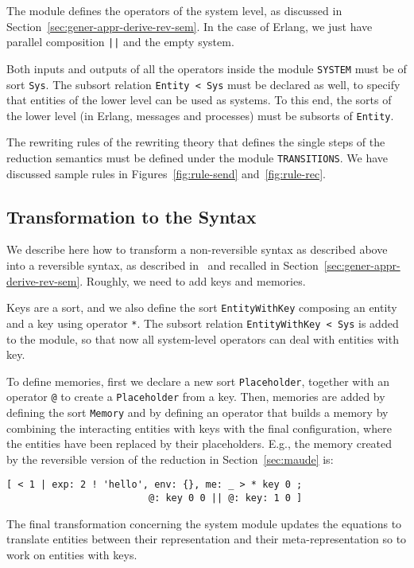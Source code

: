 \documentclass{article}[12pt,a4paper]
\theoremstyle{definition}
\begin{document}
The module defines the operators of the system level, as discussed in Section~\ref{sec:gener-appr-derive-rev-sem}. In the case of Erlang, we just have parallel composition \verb+||+ and the empty system.

Both inputs and outputs of all the operators inside the module \verb+SYSTEM+ must be of sort
\verb+Sys+. The subsort
relation \verb+Entity < Sys+ must be declared as well, to specify that
entities of the lower level can be used as systems.
To this end, the sorts of the lower level (in Erlang, messages and processes) must be subsorts of
\verb+Entity+.

The rewriting rules of the rewriting theory that defines the
single steps of the reduction semantics must be defined under the module
\verb+TRANSITIONS+. We have discussed sample rules in Figures~\ref{fig:rule-send} and~\ref{fig:rule-rec}.

\subsection{Transformation to the Syntax}
We describe here how to transform a non-reversible syntax as
described above into a reversible syntax, as described
in~\cite{LaneseM20} and recalled in
Section~\ref{sec:gener-appr-derive-rev-sem}. Roughly, we need to add
keys and memories.

Keys are a sort, and we also define the sort \verb+EntityWithKey+ composing an entity and a key using operator \verb+*+.
The subsort relation \verb+EntityWithKey < Sys+ is added to the module, so that now all system-level
operators can deal with entities with key. 

To define memories, first we declare a new sort \verb+Placeholder+,
together with an operator \verb+@+ to create a \verb+Placeholder+ from a key.
Then, memories are added by defining the sort \verb+Memory+ and by defining an
operator that builds a memory by combining the interacting entities with keys with the final configuration, where the
entities have been replaced by their placeholders. E.g., the memory created by the reversible version of the reduction in Section~\ref{sec:maude} is:

\begin{verbatim}
[ < 1 | exp: 2 ! 'hello', env: {}, me: _ > * key 0 ; 
                         @: key 0 0 || @: key: 1 0 ]
\end{verbatim}

The final transformation concerning the system module updates the
equations to translate entities between their representation and their
meta-representation so to work on entities with keys.
\end{document}

